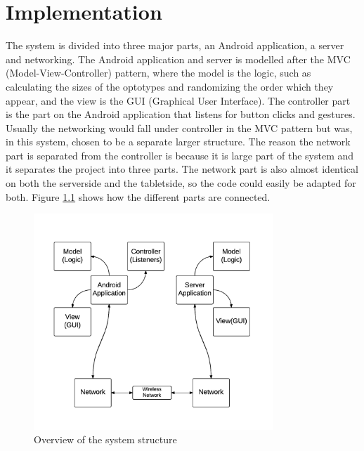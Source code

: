 \documentclass[12pt,a4paper,notitlepage]{report}
\begin{document}
\chapter{ Implementation}
The system is divided into three major parts, an Android application, a server and networking. The Android application and server is modelled after the MVC (Model-View-Controller) pattern, where the model is the logic, such as calculating the sizes of the optotypes and randomizing the order which they appear, and the view is the GUI (Graphical User Interface). The controller part is the part on the Android application that listens for button clicks and gestures. Usually the networking would fall under controller in the MVC pattern but was, in this system, chosen to be a separate larger structure. The reason the network part is separated from the controller is because it is large part of the system and it separates the project into three parts. The network part is also almost identical on both the serverside and the tabletside, so the code could easily be adapted for both. Figure \ref{system_structure} shows how the different parts are connected.

\begin{figure}[ht!]
\centering
\includegraphics[width=90mm]{images/system_structure.png}
\caption{Overview of the system structure\label{system_structure}}
\end{figure}
\end{document}
